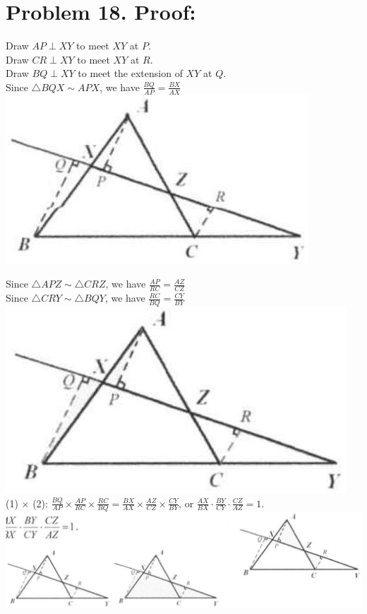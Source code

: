 \documentclass[10pt]{article}
\begin{document}
\section*{Problem 18. Proof:}
Draw \(A P \perp X Y\) to meet \(X Y\) at \(P\).\\
Draw \(C R \perp X Y\) to meet \(X Y\) at \(R\).\\
Draw \(B Q \perp X Y\) to meet the extension of \(X Y\) at \(Q\).\\
Since \(\triangle B Q X \sim A P X\), we have \(\frac{B Q}{A P}=\frac{B X}{A X}\)\\
\includegraphics[max width=\textwidth, center]{2025_04_17_97bc1f7e44d93c271a88g-099(1)}

Since \(\triangle A P Z \sim \triangle C R Z\), we have \(\frac{A P}{R C}=\frac{A Z}{C Z}\)\\
Since \(\triangle C R Y \sim \triangle B Q Y\), we have \(\frac{R C}{B Q}=\frac{C Y}{B Y}\)\\
\includegraphics[max width=\textwidth, center]{2025_04_17_97bc1f7e44d93c271a88g-099}\\
(1) \(\times\) (2): \(\frac{B Q}{A P} \times \frac{A P}{R C} \times \frac{R C}{B Q}=\frac{B X}{A X} \times \frac{A Z}{C Z} \times \frac{C Y}{B Y}\), or \(\frac{A X}{B X} \cdot \frac{B Y}{C Y} \cdot \frac{C Z}{A Z}=1\).\\
\includegraphics[max width=\textwidth, center]{2025_04_17_97bc1f7e44d93c271a88g-099(2)}
\end{document}
